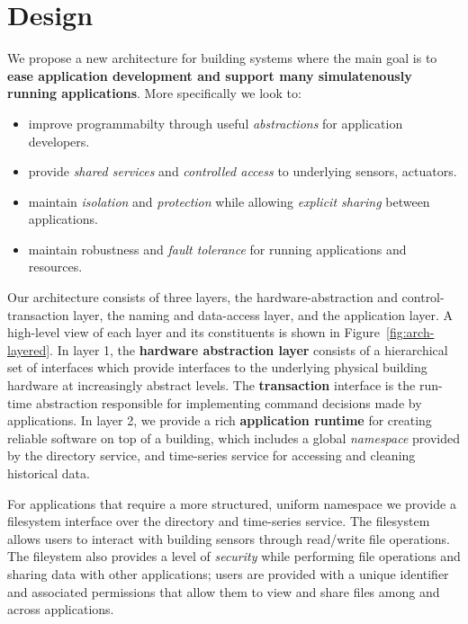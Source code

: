 \section{Design}


We propose a new architecture for building systems where the main goal is to {\bf ease application development and support many simulatenously running applications}.  More specifically we look to:

\begin{itemize}
\item improve programmabilty through useful \emph{abstractions} for application developers.
\item provide \emph{shared services} and \emph{controlled access} to underlying sensors, actuators.
\item maintain \emph{isolation} and \emph{protection} while allowing \emph{explicit sharing} between applications.
\item maintain robustness and \emph{fault tolerance} for running applications and resources.
\end{itemize}

Our architecture consists of three layers, the hardware-abstraction and control-transaction layer, the naming and data-access layer, and the application layer.  A high-level view of each layer and its constituents is shown in Figure~\ref{fig:arch-layered}.  In layer 1, the {\bf hardware abstraction layer} consists of a hierarchical set of interfaces which provide interfaces to the underlying physical building hardware at increasingly abstract levels.  The {\bf transaction} interface is the run-time abstraction responsible for implementing command decisions made by applications.  In layer 2, we provide a rich {\bf application runtime} for creating reliable software on top of a building, which includes a global {\it namespace} provided by the directory service, and time-series service for accessing and cleaning historical data.  

For applications that require a more structured, uniform namespace we provide a filesystem interface over the directory and time-series service.  The filesystem allows users to interact with building sensors through read/write file operations.  The fileystem also provides a level of {\it security} while performing file operations and sharing data with other applications; users are provided with a unique identifier and associated permissions that allow them to view and share files among and across applications.

